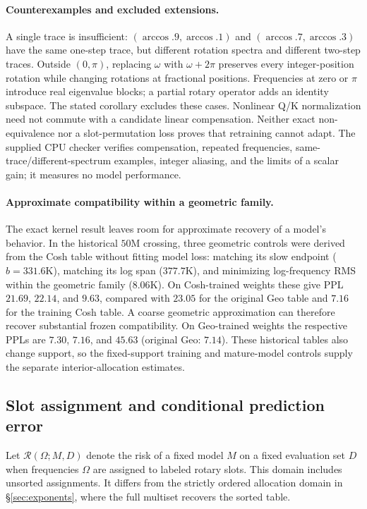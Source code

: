 \paragraph{Counterexamples and excluded extensions.}
A single trace is insufficient: $(\arccos .9,\arccos .1)$ and
$(\arccos .7,\arccos .3)$ have the same one-step trace, but different
rotation spectra and different two-step traces. Outside $(0,\pi)$, replacing
$\omega$ with $\omega+2\pi$ preserves every integer-position rotation while
changing rotations at fractional positions. Frequencies at zero or $\pi$
introduce real eigenvalue blocks; a partial rotary operator adds an identity
subspace. The stated corollary excludes these cases. Nonlinear Q/K
normalization need not commute with a candidate linear compensation.
Neither exact non-equivalence nor a slot-permutation loss proves that
retraining cannot adapt. The supplied CPU checker verifies compensation,
repeated frequencies, same-trace/different-spectrum examples, integer
aliasing, and the limits of a scalar gain; it measures no model performance.

\FloatBarrier
\paragraph{Approximate compatibility within a geometric family.}
The exact kernel result leaves room for approximate recovery of a model's behavior. In the historical $50$M crossing, three geometric controls were derived from the Cosh table without fitting model loss: matching its slow endpoint ($b=331.6$K), matching its log span ($377.7$K), and minimizing log-frequency RMS within the geometric family ($8.06$K). On Cosh-trained weights these give PPL $21.69$, $22.14$, and $9.63$, compared with $23.05$ for the original Geo table and $7.16$ for the training Cosh table. A coarse geometric approximation can therefore recover substantial frozen compatibility. On Geo-trained weights the respective PPLs are $7.30$, $7.16$, and $45.63$ (original Geo: $7.14$). These historical tables also change support, so the fixed-support training and mature-model controls supply the separate interior-allocation estimates.

\subsection{Slot assignment and conditional prediction error}
\label{sec:non-identifiability-proof}

Let $\mathcal R(\Omega;M,D)$ denote the risk of a fixed model $M$ on a fixed evaluation set $D$ when frequencies $\Omega$ are assigned to labeled rotary slots. This domain includes unsorted assignments. It differs from the strictly ordered allocation domain in \S\ref{sec:exponents}, where the full multiset recovers the sorted table.


